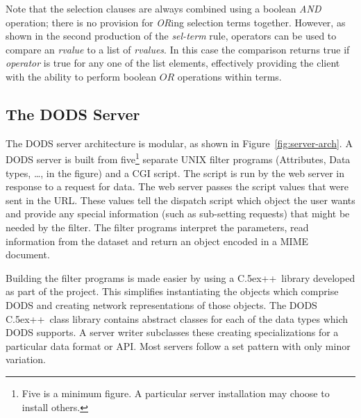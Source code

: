\documentclass[12pt]{article}
\newcommand{\Cpp}{{\rm {\small C}\raise.5ex\hbox{\footnotesize ++}}}
\begin{document}
Note that the selection clauses are always combined using a boolean \emph{AND}
operation; there is no provision for \emph{OR}ing selection terms together.
However, as shown in the second production of the \emph{sel-term} rule,
operators can be used to compare an \emph{rvalue} to a list of
\emph{rvalues}. In this case the comparison returns true if \emph{operator}
is true for any one of the list elements, effectively providing the client
with the ability to perform boolean $OR$ operations within terms.

\subsection{The DODS Server}
\label{servers}

The \ac{DODS} server architecture is modular, as shown in
Figure~\ref{fig:server-arch}.  A \ac{DODS} server is built from
five\footnote{Five is a minimum figure.  A particular server installation may
  choose to install others.} separate UNIX filter programs (Attributes, Data
types, \ldots, in the figure) and a \ac{CGI} script.  The script is run by the
web server in response to a request for data. The web server passes the
script values that were sent in the \acs{URL}. These values tell the dispatch
script which object the user wants and provide any special information (such
as sub-setting requests) that might be needed by the filter. The filter
programs interpret the parameters, read information from the dataset and
return an object encoded in a \acs{MIME} document.


Building the filter programs is made easier by using a \Cpp\ library developed
as part of the project. This simplifies instantiating the objects which
comprise \ac{DODS} and creating network representations of those objects. The
\ac{DODS} \Cpp\ class library contains abstract classes for each of the data
types which \ac{DODS} supports. A server writer subclasses these creating
specializations for a particular data format or \ac{API}. Most servers follow
a set pattern with only minor variation.
\end{document}
